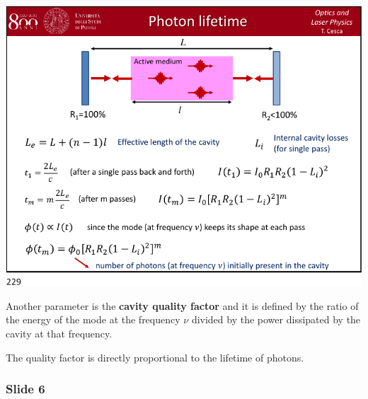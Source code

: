 \documentclass[../main/main.tex]{subfiles}
\begin{document}
\begin{minipage}[]{0.5\linewidth}
\centering
\includegraphics[page=5,width=1\textwidth]{../lessons/pdf_file/12_lecture.pdf}
\end{minipage}
\hspace{0.3cm}\vspace{0.3cm}
\begin{minipage}[c]{0.47\linewidth}

Another parameter is the \textbf{cavity quality factor} and it is defined by the ratio of the energy of the mode at the frequency \( \nu  \) divided by the power dissipated by the cavity at that frequency.

The quality factor is directly proportional to the lifetime of photons.

\end{minipage}

\subsubsection*{Slide 6}
\end{document}

